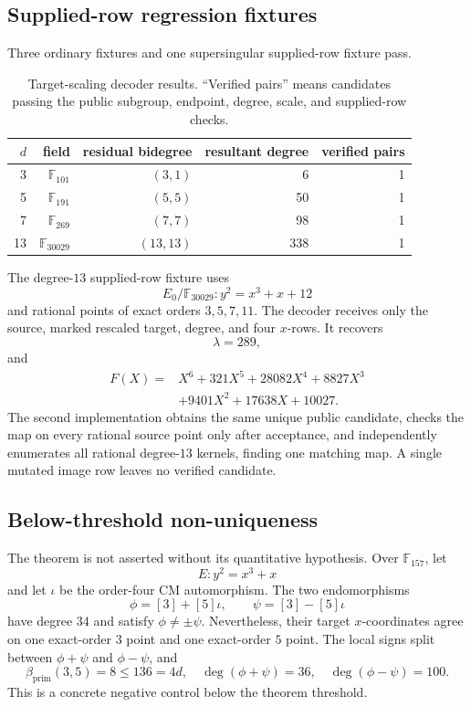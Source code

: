 \documentclass[11pt]{article}
\newcommand{\F}{\mathbb{F}}
\newcommand{\betaP}{\beta_{\mathrm{prim}}}
\begin{document}
\subsection{Supplied-row regression fixtures}

Three ordinary fixtures and one supersingular supplied-row fixture pass.

\begin{table}[h]
\centering
\begin{tabular}{rrrrr}
\toprule
$d$ & field & residual bidegree & resultant degree & verified pairs\\
\midrule
3  & $\F_{101}$   & $(3,1)$   & 6   & 1\\
5  & $\F_{191}$   & $(5,5)$   & 50  & 1\\
7  & $\F_{269}$   & $(7,7)$   & 98  & 1\\
13 & $\F_{30029}$ & $(13,13)$ & 338 & 1\\
\bottomrule
\end{tabular}
\caption{Target-scaling decoder results.  ``Verified pairs'' means candidates
passing the public subgroup, endpoint, degree, scale, and supplied-row checks.}
\label{tab:fixtures}
\end{table}

The degree-$13$ supplied-row fixture uses
\[
 E_0/\F_{30029}:y^2=x^3+x+12
\]
and rational points of exact orders $3,5,7,11$.  The decoder receives only
the source, marked rescaled target, degree, and four $x$-rows.  It recovers
\[
 \lambda=289,
\]
and
\[
\begin{split}
 F(X)={}&X^6+321X^5+28082X^4+8827X^3\\
       &+9401X^2+17638X+10027.
\end{split}
\]
The second implementation obtains the same unique public candidate, checks the
map on every rational source point only after acceptance, and independently
enumerates all rational degree-$13$ kernels, finding one matching map.  A
single mutated image row leaves no verified candidate.

\subsection{Below-threshold non-uniqueness}

The theorem is not asserted without its quantitative hypothesis.  Over
$\F_{157}$, let
\[
 E:y^2=x^3+x
\]
and let $\iota$ be the order-four CM automorphism.  The two endomorphisms
\[
 \phi=[3]+[5]\iota,\qquad \psi=[3]-[5]\iota
\]
have degree $34$ and satisfy $\phi\ne\pm\psi$.  Nevertheless, their target
$x$-coordinates agree on one exact-order $3$ point and one exact-order $5$
point.  The local signs split between $\phi+\psi$ and $\phi-\psi$, and
\[
 \betaP(3,5)=8\le136=4d,
 \quad \deg(\phi+\psi)=36,
 \quad \deg(\phi-\psi)=100.
\]
This is a concrete negative control below the theorem threshold.
\end{document}
